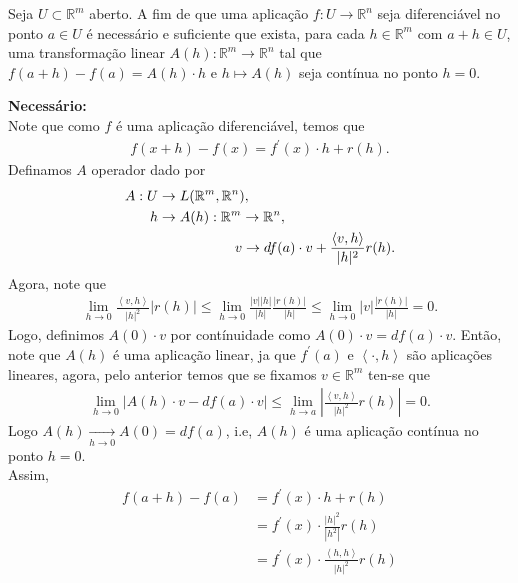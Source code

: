 \begin{homeworkProblem}
  Seja $U \subset \mathbb{R}^m$ aberto. A fim de que uma aplicação $f : U \to \mathbb{R}^n$ seja diferenciável no ponto $a \in U$ é necessário e suficiente que exista, para cada $h \in \mathbb{R}^m$ com $a+h \in U$, uma transformação linear $A(h):\mathbb{R}^m \to \mathbb{R}^n$ tal que $f(a+h)-f(a)=A(h)\cdot h$ e $h \mapsto A(h)$ seja contínua no ponto $h=0$.
  \begin{solution}
  \textbf{Necessário:}\\
    Note que como $f$ é uma aplicação diferenciável, temos que
    \begin{align*}
      f(x+h)-f(x)=f^{\prime}(x)\cdot h+r(h).
    \end{align*}
    Definamos $A$ operador dado por
    \begin{align*}
      A:U&\to L(\mathbb{R}^{m},\mathbb{R}^{n}),\\
      h&\to A(h):\mathbb{R}^{m}\to\mathbb{R}^{n},\\
      \phantom{h}&\phantom{\to A(h):}\hspace{0.55cm}v\to df(a)\cdot v+\frac{\left\langle v,h \right\rangle}{|h|^{2}}r(h).
    \end{align*}
    Agora, note que
    \begin{align*}
      \lim_{h \to 0}\frac{\left\langle v,h \right\rangle}{|h|^{2}}|r(h)|\leq \lim_{h \to 0}\frac{|v||h|}{|h|}\frac{|r(h)|}{|h|}\leq \lim_{h \to 0}|v|\frac{|r(h)|}{|h|}=0.
    \end{align*}
    Logo, definimos $A(0)\cdot v$ por contínuidade como $A(0)\cdot v=df(a)\cdot v$. Então, note que $A(h)$ é uma aplicação linear, ja que $f^{\prime}(a)$ e $\left\langle \cdot,h \right\rangle$ são aplicações lineares, agora, pelo anterior temos que se fixamos $v\in\mathbb{R}^{m}$ ten-se que 
    \begin{align*}
      \lim_{h \to 0}|A(h)\cdot v-df(a)\cdot v|\leq \lim_{h \to a}\left| \frac{\left\langle v,h \right\rangle}{|h|^{2}}r(h) \right|=0.
    \end{align*}
    Logo $A(h)\xrightarrow[h\to 0]{}A(0)=df(a)$, i.e, $A(h)$ é uma aplicação contínua no ponto $h=0$.\\
    Assim,
    \begin{align*}
      f(a+h)-f(a)&= f^{\prime}(x)\cdot h + r(h)\\
      &=f^{\prime}(x)\cdot \frac{|h|^{2}}{|h^{2}|}r(h)\\
      &=f^{\prime}(x)\cdot \frac{\left\langle h,h \right\rangle}{|h|^{2}}r(h)\\

\end{align*}
\end{solution}
\end{homeworkProblem}
